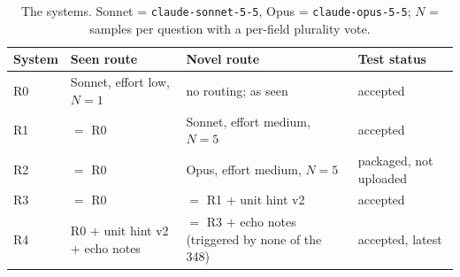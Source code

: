 \begin{table}[t]
\caption{The systems. Sonnet = \texttt{claude-sonnet-5-5}, Opus = \texttt{claude-opus-5-5}; $N$ = samples per question with a per-field plurality vote.}
\label{tab:systems}
\centering
\scriptsize
\setlength{\tabcolsep}{4pt}
\begin{tabular}{@{}lp{2.0cm}p{2.55cm}p{1.55cm}@{}}
\toprule
System & Seen route & Novel route & Test status \\
\midrule
R0 & Sonnet, effort low, $N{=}1$ & no routing; as seen & accepted \\
R1 & $=$ R0 & Sonnet, effort medium, $N{=}5$ & accepted \\
R2 & $=$ R0 & Opus, effort medium, $N{=}5$ & packaged, not uploaded \\
R3 & $=$ R0 & $=$ R1 $+$ unit hint v2 & accepted \\
R4 & R0 $+$ unit hint v2 $+$ echo notes & $=$ R3 $+$ echo notes (triggered by none of the 348) & accepted, latest \\
\bottomrule
\end{tabular}
\end{table}
